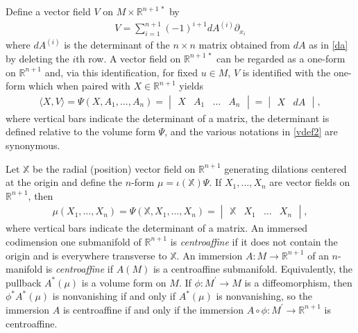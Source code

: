 \documentclass [leqno, 10pt]{amsart}
\theoremstyle{definition}
\numberwithin{equation}{section}
\newcommand{\imt}{\iota}
\newcommand{\pr}{\partial}
\newcommand{\lb}{\langle}
\newcommand{\ra}{\rangle}
\newcommand{\eul}{\mathbb{X}}
\newcommand{\rea}{\mathbb R}
\begin{document}
Define a vector field $V$ on $M \times \rea^{n+1\,\ast}$ by
\begin{align}\label{vdef}
V = \sum_{i = 1}^{n+1}(-1)^{i+1}dA^{(i)}\pr_{x_{i}} 
\end{align}
where $dA^{(i)}$ is the determinant of the $n \times n$ matrix obtained from $dA$ as in \eqref{da} by deleting the $i$th row. A vector field on $\rea^{n+1\,\ast}$ can be regarded as a one-form on $\rea^{n+1}$ and, via this identification, for fixed $u \in M$, $V$ is identified with the one-form which when paired with $X \in \rea^{n+1}$ yields
\begin{align}\label{vdef2}
\lb X, V\ra = \Psi(X, A_{1}, \dots, A_{n}) = \begin{vmatrix} X & A_{1} & \dots & A_{n}\end{vmatrix} = \begin{vmatrix} X & dA \end{vmatrix},
\end{align}
where vertical bars indicate the determinant of a matrix, the determinant is defined relative to the volume form $\Psi$, and the various notations in \eqref{vdef2} are synonymous.

Let $\eul$ be the radial (position) vector field on $\rea^{n+1}$ generating dilations centered at the origin and define the $n$-form $\mu = \imt(\eul)\Psi$. If $X_{1}, \dots, X_{n}$ are vector fields on $\rea^{n+1}$, then
\begin{align}
\mu(X_{1}, \dots, X_{n}) = \Psi(\eul, X_{1}, \dots, X_{n}) = \begin{vmatrix} \eul & X_{1} & \dots & X_{n}\end{vmatrix},
\end{align}
where vertical bars indicate the determinant of a matrix. An immersed codimension one submanifold of $\rea^{n+1}$ is \textit{centroaffine} if it does not contain the origin and is everywhere transverse to $\eul$. An immersion $A:M \to \rea^{n+1}$ of an $n$-manifold is \textit{centroaffine} if $A(M)$ is a centroaffine submanifold. 
Equivalently, the pullback $A^{\ast}(\mu)$ is a volume form on $M$. If $\phi:M^{\prime} \to M$ is a diffeomorphism, then $\phi^{\ast}A^{\ast}(\mu)$ is nonvanishing if and only if $A^{\ast}(\mu)$ is nonvanishing, so the immersion $A$ is centroaffine if and only if the immersion $A \circ \phi:M^{\prime} \to \rea^{n+1}$ is centroaffine.
\end{document}
